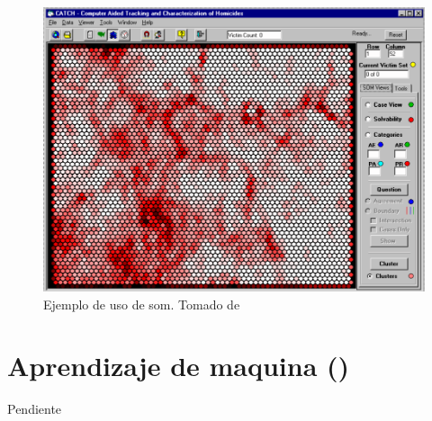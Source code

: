 \begin{figure}[th]
\centering
\includegraphics[scale=0.3]{Figures/som-example.png}
\decoRule
\caption[Ejemplo de uso de \gls{som}]{Ejemplo de uso de \gls{som}. Tomado de \cite{mena2003investigative}}
\label{fig:som-example}
\end{figure}


\section{Aprendizaje de maquina ()} \label{secML}
Pendiente